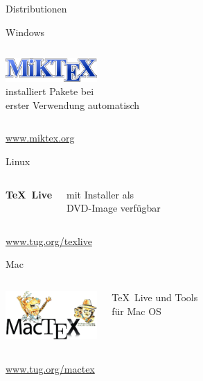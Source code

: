\begin{Frame}[t]{Distributionen}
  \begin{Block}{Windows}
    \begin{columns}
      \column{1mm}
      \column{5cm}
      \vskip2pt\par
      \includegraphics[width=3.5cm]{images/miktex}\\

      \column{5cm}
      installiert Pakete bei\\ erster Verwendung automatisch
    \end{columns}

    \url{www.miktex.org}
  \end{Block}

  \begin{Block}{Linux}
    \begin{columns}
      \column{1mm}
      \column{5cm}
      \vskip4pt\par
      \textcolor{texlive}{\Huge\bfseries\TeX\ Live}

      \column{5cm}
      mit Installer als\\ DVD-Image verfügbar
    \end{columns}

    \url{www.tug.org/texlive}
  \end{Block}

  \begin{Block}{Mac}
    \begin{columns}
      \column{1mm}
      \column{4.5cm}
      \includegraphics[width=3.5cm]{images/mactex}

      \column{5cm}
      \TeX\ Live und Tools\\ für Mac OS
    \end{columns}

    \url{www.tug.org/mactex}
  \end{Block}
\end{Frame}

